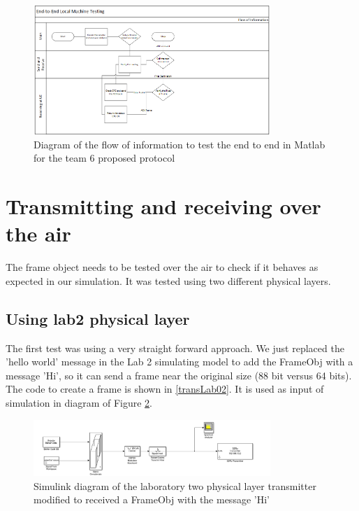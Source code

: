 



\begin{figure}[ht]
    \centering
    \includegraphics[width=0.8\textwidth]{flowEndtoEnd.PNG}
    \caption{Diagram of the flow of information to test the end to end in Matlab for the team 6 proposed protocol}
    \label{fig:endendDiagram}
\end{figure} 

\section{Transmitting and receiving over the air}
The frame object needs to be tested over the air to check if it behaves as expected in our simulation. 
It was tested using two different physical layers. 
\subsection{Using lab2 physical layer}

The first test was using a very straight forward approach. We just replaced the 'hello world' message in the Lab 2 
simulating model to add the FrameObj with a message 'Hi', so it can send a frame near the original size (88 bit versus 64 bits).
The code to create a frame is shown in \ref{transLab02}. It is used as input of simulation in diagram of Figure \ref{fig:trasmitter_lab02}.



\begin{figure}[ht]
    \centering
    \includegraphics[width=0.8\textwidth]{trasmitter_lab02.PNG}
    \caption{Simulink diagram of the laboratory two physical layer transmitter modified to received a FrameObj with the message 'Hi' }
    \label{fig:trasmitter_lab02}
\end{figure}

